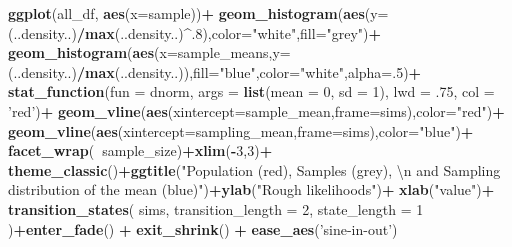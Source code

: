 \documentclass[]{book}
\newenvironment{Shaded}{\begin{snugshade}}{\end{snugshade}}
\newcommand{\CharTok}[1]{\textcolor[rgb]{0.31,0.60,0.02}{#1}}
\newcommand{\DataTypeTok}[1]{\textcolor[rgb]{0.13,0.29,0.53}{#1}}
\newcommand{\DecValTok}[1]{\textcolor[rgb]{0.00,0.00,0.81}{#1}}
\newcommand{\FloatTok}[1]{\textcolor[rgb]{0.00,0.00,0.81}{#1}}
\newcommand{\KeywordTok}[1]{\textcolor[rgb]{0.13,0.29,0.53}{\textbf{#1}}}
\newcommand{\NormalTok}[1]{#1}
\newcommand{\OperatorTok}[1]{\textcolor[rgb]{0.81,0.36,0.00}{\textbf{#1}}}
\newcommand{\StringTok}[1]{\textcolor[rgb]{0.31,0.60,0.02}{#1}}
\begin{document}
\begin{Shaded}
\begin{Highlighting}[]
\KeywordTok{ggplot}\NormalTok{(all_df, }\KeywordTok{aes}\NormalTok{(}\DataTypeTok{x=}\NormalTok{sample))}\OperatorTok{+}
\StringTok{  }\KeywordTok{geom_histogram}\NormalTok{(}\KeywordTok{aes}\NormalTok{(}\DataTypeTok{y=}\NormalTok{(..density..)}\OperatorTok{/}\KeywordTok{max}\NormalTok{(..density..)}\OperatorTok{^}\NormalTok{.}\DecValTok{8}\NormalTok{),}\DataTypeTok{color=}\StringTok{"white"}\NormalTok{,}\DataTypeTok{fill=}\StringTok{"grey"}\NormalTok{)}\OperatorTok{+}
\StringTok{  }\KeywordTok{geom_histogram}\NormalTok{(}\KeywordTok{aes}\NormalTok{(}\DataTypeTok{x=}\NormalTok{sample_means,}\DataTypeTok{y=}\NormalTok{(..density..)}\OperatorTok{/}\KeywordTok{max}\NormalTok{(..density..)),}\DataTypeTok{fill=}\StringTok{"blue"}\NormalTok{,}\DataTypeTok{color=}\StringTok{"white"}\NormalTok{,}\DataTypeTok{alpha=}\NormalTok{.}\DecValTok{5}\NormalTok{)}\OperatorTok{+}
\StringTok{  }\KeywordTok{stat_function}\NormalTok{(}\DataTypeTok{fun =}\NormalTok{ dnorm, }
                \DataTypeTok{args =} \KeywordTok{list}\NormalTok{(}\DataTypeTok{mean =} \DecValTok{0}\NormalTok{, }\DataTypeTok{sd =} \DecValTok{1}\NormalTok{), }
                \DataTypeTok{lwd =} \FloatTok{.75}\NormalTok{, }
                \DataTypeTok{col =} \StringTok{'red'}\NormalTok{)}\OperatorTok{+}
\StringTok{  }\KeywordTok{geom_vline}\NormalTok{(}\KeywordTok{aes}\NormalTok{(}\DataTypeTok{xintercept=}\NormalTok{sample_mean,}\DataTypeTok{frame=}\NormalTok{sims),}\DataTypeTok{color=}\StringTok{"red"}\NormalTok{)}\OperatorTok{+}
\StringTok{  }\KeywordTok{geom_vline}\NormalTok{(}\KeywordTok{aes}\NormalTok{(}\DataTypeTok{xintercept=}\NormalTok{sampling_mean,}\DataTypeTok{frame=}\NormalTok{sims),}\DataTypeTok{color=}\StringTok{"blue"}\NormalTok{)}\OperatorTok{+}
\StringTok{  }\KeywordTok{facet_wrap}\NormalTok{(}\OperatorTok{~}\NormalTok{sample_size)}\OperatorTok{+}\KeywordTok{xlim}\NormalTok{(}\OperatorTok{-}\DecValTok{3}\NormalTok{,}\DecValTok{3}\NormalTok{)}\OperatorTok{+}
\StringTok{  }\KeywordTok{theme_classic}\NormalTok{()}\OperatorTok{+}\KeywordTok{ggtitle}\NormalTok{(}\StringTok{"Population (red), Samples (grey), }\CharTok{\textbackslash{}n}\StringTok{ and Sampling distribution of the mean (blue)"}\NormalTok{)}\OperatorTok{+}\KeywordTok{ylab}\NormalTok{(}\StringTok{"Rough likelihoods"}\NormalTok{)}\OperatorTok{+}
\StringTok{  }\KeywordTok{xlab}\NormalTok{(}\StringTok{"value"}\NormalTok{)}\OperatorTok{+}
\StringTok{  }\KeywordTok{transition_states}\NormalTok{(}
\NormalTok{    sims,}
    \DataTypeTok{transition_length =} \DecValTok{2}\NormalTok{,}
    \DataTypeTok{state_length =} \DecValTok{1}
\NormalTok{  )}\OperatorTok{+}\KeywordTok{enter_fade}\NormalTok{() }\OperatorTok{+}\StringTok{ }
\StringTok{  }\KeywordTok{exit_shrink}\NormalTok{() }\OperatorTok{+}
\StringTok{  }\KeywordTok{ease_aes}\NormalTok{(}\StringTok{'sine-in-out'}\NormalTok{)}
\end{Highlighting}
\end{Shaded}
\end{document}
